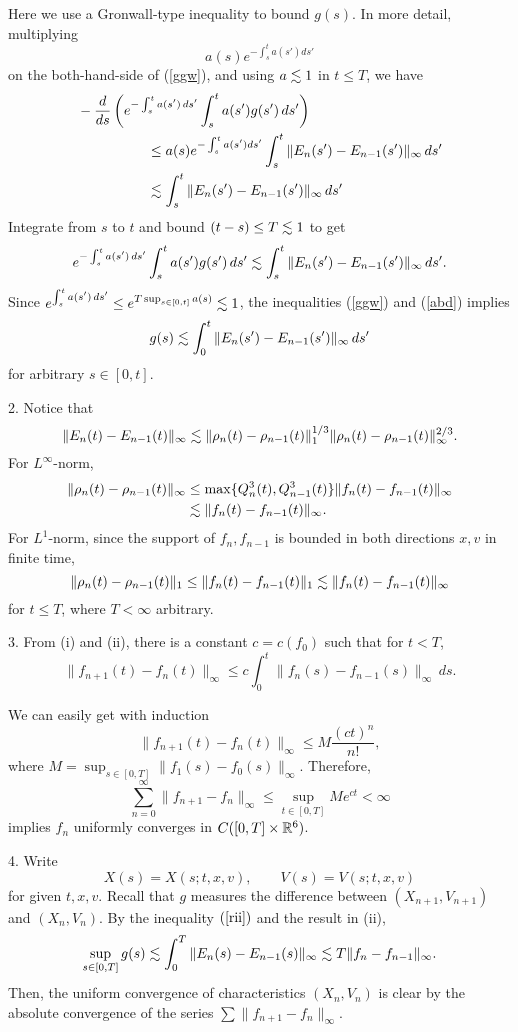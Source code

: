 \documentclass[11pt]{amsart}
\begin{document}
\begin{pf}
Here we use a Gronwall-type inequality to bound $g(s)$.
In more detail, multiplying
\[a(s)e^{-\int_s^ta(s')ds'}\]
on the both-hand-side of (\ref{ggw}), and using $a\lesssim 1$ in $t\le T$, we have
\begin{align*}
&-\dd{s}\left(e^{-\int_s^ta(s')\,ds'}\int_s^ta(s')g(s')\,ds'\right)\\
&\hspace{5em}\le a(s)e^{-\int_s^ta(s')ds'}\int_s^t\|E_n(s')-E_{n-1}(s')\|_\infty\,ds'\\
&\hspace{5em}\les\int_s^t\|E_n(s')-E_{n-1}(s')\|_\infty\,ds'
\end{align*}
Integrate from $s$ to $t$ and bound $(t-s)\le T\lesssim1$ to get
\begin{align}\label{abd}
e^{-\int_s^ta(s')\,ds'}\int_s^ta(s')g(s')\,ds'\lesssim\int_s^t\|E_n(s')-E_{n-1}(s')\|_\infty\,ds'.
\end{align}
Since $e^{\int_s^ta(s')\,ds'}\le e^{T\sup_{s\in[0,t]}a(s)}\lesssim1$, the inequalities (\ref{ggw}) and (\ref{abd}) implies
\begin{align}\label{rii}
g(s)\lesssim\int_0^t\|E_n(s')-E_{n-1}(s')\|_\infty\,ds'
\end{align}
for arbitrary $s\in[0,t]$.

2.
Notice that
\[\|E_n(t)-E_{n-1}(t)\|_\infty\lesssim\|\rho_n(t)-\rho_{n-1}(t)\|_1^{1/3}\|\rho_n(t)-\rho_{n-1}(t)\|_\infty^{2/3}.\]
For $L^\infty$-norm,
\begin{align*}
\|\rho_n(t)-\rho_{n-1}(t)\|_\infty
&\le\max\{Q_n^3(t),Q_{n-1}^3(t)\}\|f_n(t)-f_{n-1}(t)\|_\infty\\
&\lesssim\|f_n(t)-f_{n-1}(t)\|_\infty.
\end{align*}
For $L^1$-norm, since the support of $f_n,f_{n-1}$ is bounded in both directions $x,v$ in finite time,
\[\|\rho_n(t)-\rho_{n-1}(t)\|_1\le\|f_n(t)-f_{n-1}(t)\|_1\lesssim\|f_n(t)-f_{n-1}(t)\|_\infty\]
for $t\le T$, where $T<\infty$ arbitrary.

3.
From (i) and (ii), there is a constant $c=c(f_0)$ such that for $t<T$,
\[\|f_{n+1}(t)-f_n(t)\|_\infty\le c\int_0^t\|f_n(s)-f_{n-1}(s)\|_\infty\,ds.\]

We can easily get with induction
\[\|f_{n+1}(t)-f_n(t)\|_\infty\le M\frac{(ct)^n}{n!},\]
where $M=\sup_{s\in[0,T]}\|f_1(s)-f_0(s)\|_\infty$.
Therefore,
\[\sum_{n=0}^\infty\|f_{n+1}-f_n\|_\infty\le\sup_{t\in[0,T]}Me^{ct}<\infty\]
implies $f_n$ uniformly converges in $C([0,T]\times\mathbb{R}^6)$.

4.
Write
\[X(s)=X(s;t,x,v),\qquad V(s)=V(s;t,x,v)\]
for given $t,x,v$.
Recall that $g$ measures the difference between $(X_{n+1},V_{n+1})$ and $(X_n,V_n)$.
By the inequality $(\ref{rii})$ and the result in (ii),
\begin{align*}
\sup_{s\in[0,T]}g(s)\lesssim\int_0^T\|E_n(s)-E_{n-1}(s)\|_\infty\lesssim T\|f_n-f_{n-1}\|_\infty.
\end{align*}
Then, the uniform convergence of characteristics $(X_n,V_n)$ is clear by the absolute convergence of the series $\sum\|f_{n+1}-f_n\|_\infty$.


\end{pf}
\end{document}
